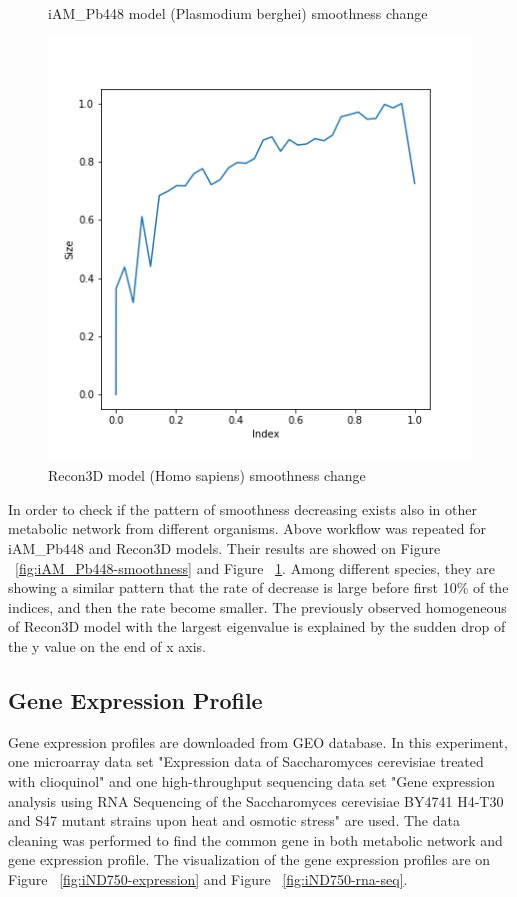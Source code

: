 \documentclass{article} %
\begin{document}
\begin{figure}[!htb]
  \caption{iAM\_Pb448 model (Plasmodium berghei) smoothness change}\label{fig:iAM_Pb448-smoothness}
\endminipage\hfill
{}%
  \includegraphics[width=\linewidth]{images/Recon3D-smoothness.png}
  \caption{Recon3D model (Homo sapiens) smoothness change}\label{fig:Recon3D-smoothness}
\endminipage
\end{figure}

In order to check if the pattern of smoothness decreasing exists also in other metabolic network from different organisms. Above workflow was repeated for iAM\_Pb448 and Recon3D models. Their results are showed on Figure ~\ref{fig:iAM_Pb448-smoothness} and Figure ~\ref{fig:Recon3D-smoothness}. Among different species, they are showing a similar pattern that the rate of decrease is large before first 10\% of the indices, and then the rate become smaller. The previously observed homogeneous of Recon3D model with the largest eigenvalue is explained by the sudden drop of the y value on the end of x axis.

\subsection{Gene Expression Profile}
Gene expression profiles are downloaded from GEO database. In this experiment, one microarray data set "Expression data of Saccharomyces cerevisiae treated with clioquinol" \cite{noauthor_geo_nodate} and one high-throughput sequencing data set "Gene expression analysis using RNA Sequencing of the Saccharomyces cerevisiae BY4741 H4-T30 and S47 mutant strains upon heat and osmotic stress" \cite{noauthor_geo_nodate-1} are used. The data cleaning was performed to find the common gene in both metabolic network and gene expression profile. The visualization of the gene expression profiles are on Figure ~\ref{fig:iND750-expression} and Figure ~\ref{fig:iND750-rna-seq}.
\end{document}
